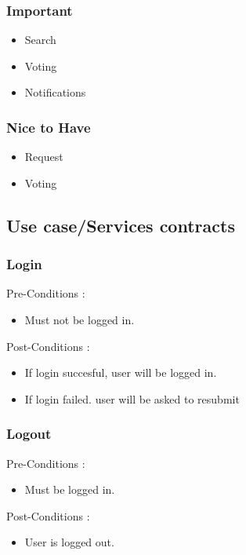 \documentclass[12pt, oneside]{article}
\begin{document}
		\subsubsection{Important}
			\begin{itemize}
				\item Search
				\item Voting
				\item Notifications
			 \end{itemize}
		\subsubsection{Nice to Have}
			\begin{itemize}
				\item Request
				\item Voting
			 \end{itemize}
	\subsection{Use case/Services contracts}
			\subsubsection{Login}
				Pre-Conditions : \begin{itemize}
							\item Must not be logged in.
						     \end{itemize}
				Post-Conditions : \begin{itemize}
							\item If login succesful, user will be logged in.
							\item If login failed. user will be asked to resubmit
						     \end{itemize}
			\subsubsection{Logout}
				Pre-Conditions : \begin{itemize}
							\item Must be logged in.
						     \end{itemize}
				Post-Conditions : \begin{itemize}
							\item User is logged out.
						     \end{itemize}
\end{document}
